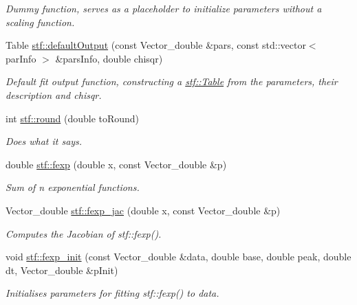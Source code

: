 \begin{DoxyCompactItemize}
\begin{DoxyCompactList}\small\item\em Dummy function, serves as a placeholder to initialize parameters without a scaling function. \item\end{DoxyCompactList}\item 
\hypertarget{group__stfgen_gacb88ca09147b65f75b9347d0d2462cef}{
Table \hyperlink{group__stfgen_gacb88ca09147b65f75b9347d0d2462cef}{stf::defaultOutput} (const Vector\_\-double \&pars, const std::vector$<$ parInfo $>$ \&parsInfo, double chisqr)}
\label{group__stfgen_gacb88ca09147b65f75b9347d0d2462cef}

\begin{DoxyCompactList}\small\item\em Default fit output function, constructing a \hyperlink{classstf_1_1Table}{stf::Table} from the parameters, their description and chisqr. \item\end{DoxyCompactList}\item 
int \hyperlink{group__stfgen_ga555e6d942a4dc2437482dbe9c5fed9ab}{stf::round} (double toRound)
\begin{DoxyCompactList}\small\item\em Does what it says. \item\end{DoxyCompactList}\item 
double \hyperlink{group__stfgen_gaa7e2a13c3f81aa07434ab6ba4da4a617}{stf::fexp} (double x, const Vector\_\-double \&p)
\begin{DoxyCompactList}\small\item\em Sum of {\itshape n\/} exponential functions. \item\end{DoxyCompactList}\item 
Vector\_\-double \hyperlink{group__stfgen_ga17dd9dd4ebcdfd99370cc21505dbca94}{stf::fexp\_\-jac} (double x, const Vector\_\-double \&p)
\begin{DoxyCompactList}\small\item\em Computes the Jacobian of stf::fexp(). \item\end{DoxyCompactList}\item 
void \hyperlink{group__stfgen_ga205a9760c992ccc914c114dcdf72eacb}{stf::fexp\_\-init} (const Vector\_\-double \&data, double base, double peak, double dt, Vector\_\-double \&pInit)
\begin{DoxyCompactList}\small\item\em Initialises parameters for fitting stf::fexp() to {\itshape data\/}. \item\end{DoxyCompactList}\item 

\end{DoxyCompactItemize}
